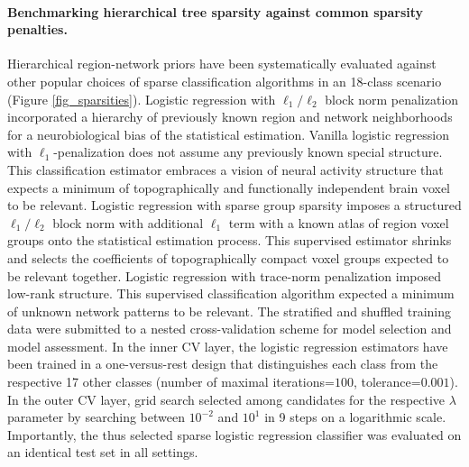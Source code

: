 \documentclass{article} %
\begin{document}
\paragraph{Benchmarking hierarchical tree sparsity against
common sparsity penalties.}
Hierarchical region-network priors have been systematically
evaluated against other popular choices of sparse classification algorithms
in an 18-class scenario
(Figure \ref{fig_sparsities}).
%
Logistic regression with $\ell_1/\ell_2$ block norm penalization
incorporated a hierarchy of previously known region and network neighborhoods
for a neurobiological bias of the statistical estimation.
%
Vanilla logistic regression with $\ell_1$-penalization
does not assume any previously known special structure.
This classification estimator embraces a vision of neural activity structure
that expects a minimum of
topographically and functionally independent brain voxel to be relevant.
%
Logistic regression with sparse group sparsity
imposes a structured $\ell_1/\ell_2$ block norm with additional $\ell_1$ term
with a known atlas of region voxel groups onto the statistical estimation process.
This supervised estimator shrinks and selects the coefficients
of topographically compact voxel groups expected to be relevant together.
%
Logistic regression with trace-norm penalization
imposed low-rank structure.
This supervised classification algorithm
expected a minimum of unknown network patterns
to be relevant.
%
The stratified and shuffled training data were submitted
to a nested cross-validation scheme
for model selection and model assessment.
In the inner CV layer, the logistic regression estimators
have been trained in a one-versus-rest design that
distinguishes each class from
the respective 17 other classes
(number of maximal iterations=$100$, tolerance=$0.001$).
In the outer CV layer, grid search
selected among candidates for the respective $\lambda$ parameter
by searching between $10^{-2}$ and $10^{1}$ in 9 steps on a logarithmic scale.
Importantly, the thus selected sparse logistic regression classifier was
evaluated on an identical test set in all settings.
\end{document}
